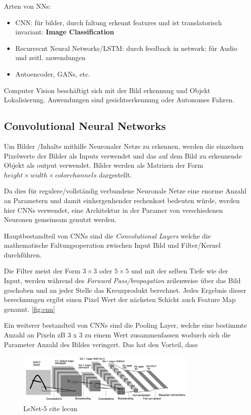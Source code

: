 Arten von NNs:
\begin{itemize}
    \item CNN: für bilder, durch faltung erkennt features und ist translatorisch invariant: \textbf{Image Classification}
    \item Recurrecnt Neural Networks/LSTM: durch feedback in network: für Audio und zeitl. anwendungen 
    \item Autoencoder, GANs, etc.
\end{itemize}

Computer Vision beschäftigt sich mit der Bild erkennung und Objekt Lokalisierung. 
Anwendungen sind gesichtserkennung oder Autonomes Fahren. 




\subsection{Convolutional Neural Networks}

Um Bilder /Inhalte mithilfe Neuronaler Netze zu erkennen, 
werden die einzelnen Pixelwerte der Bilder als Inputs verwendet 
und das auf dem Bild zu erkennende Objekt als output verwendet. Bilder 
werden als Matrizen der Form $height\times width \times color channels$ 
dargestellt.

Da dies für regulere/vollständig verbundene Neuronale Netze eine 
enorme Anzahl an Parametern und damit einhergenhender rechenkost 
bedeuten würde, werden hier CNNs verwendet, eine Architektur in 
der Paramer von verschiedenen Neuronen gemeinsam genutzt werden.

Hauptbestandteil von CNNs sind die \textit{Convolutional Layers}
welche die mathematische Faltungsoperation zwischen Input Bild 
und Filter/Kernel durchführen.

Die Filter meist der Form $3 \times 3$ oder $5 \times 5$ und mit der 
selben Tiefe wie der Input, werden während des \textit{Forward 
Pass/bropagation} zeilenweise über das Bild geschoben und an jeder Stelle 
das Kreuzprodukt berechnet. Jedes Ergebnis dieser berechnungen ergibt einen
Pixel Wert der nächsten Schicht auch Feature Map genannt. \ref{fig:cnn}

Ein weiterer bestandteil von CNNs sind die Pooling Layer, welche eine 
bestimmte Anzahl an Pixeln zB 3 x 3 zu einem Wert zusammenfassen wodurch 
sich die Parameter Anzahl des Bildes veringert. Das hat den Vorteil, dass 


\begin{figure}[htb]
    \centering
    \label{fig:lenet}
    \includegraphics[width=0.8\textwidth]{Bilder/lenet.png}
    \caption{LeNet-5 cite lecun}
\end{figure}



